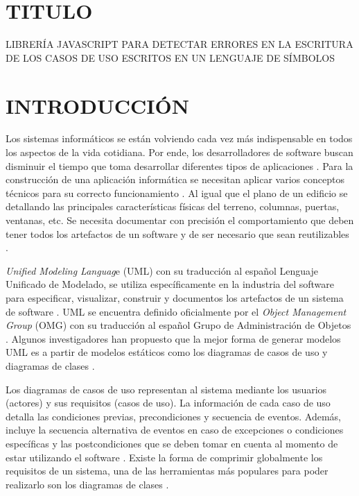 \documentclass[12pt,a4paper,final, xcolor=table, table]{article}
\begin{document}
	
	
	
	
	\section{TITULO}
	
	\par{LIBRERÍA JAVASCRIPT PARA DETECTAR ERRORES EN LA ESCRITURA DE LOS CASOS DE USO ESCRITOS EN UN LENGUAJE DE SÍMBOLOS}
	
	\section{INTRODUCCIÓN}
	
	Los sistemas informáticos se están volviendo cada vez más indispensable en todos los aspectos de la vida cotidiana. Por ende, los desarrolladores de software buscan disminuir el tiempo que toma desarrollar diferentes tipos de aplicaciones \parencite{Panthi2022}. Para la construcción de una aplicación informática se necesitan aplicar varios conceptos técnicos para su correcto funcionamiento \parencite{Chen2022}. Al igual que el plano de un edificio se detallando las principales características físicas del terreno, columnas, puertas, ventanas, etc. Se necesita documentar con precisión el comportamiento que deben tener todos los artefactos de un software y de ser necesario que sean reutilizables \parencite{Hamdi2022}.
	
	\textit{Unified Modeling Languag}e (UML) con su traducción al español Lenguaje Unificado de Modelado, se utiliza específicamente en la industria del software para especificar, visualizar, construir y documentos los artefactos de un sistema de software \parencite{Bergstrom2022}. UML se encuentra definido oficialmente por el \textit{Object Management Group} (OMG) con su traducción al español Grupo de Administración de Objetos \parencite{Omg2009}. Algunos investigadores han propuesto que la mejor forma de generar modelos UML es a partir de modelos estáticos como los diagramas de casos de uso y diagramas de clases \parencite{Jahan2021}.
	
	Los diagramas de casos de uso representan al sistema mediante los usuarios (actores) y sus requisitos (casos de uso). La información de cada caso de uso detalla las condiciones previas, precondiciones y secuencia de eventos. Además, incluye la secuencia alternativa de eventos en caso de excepciones o condiciones específicas y las postcondiciones que se deben tomar en cuenta al momento de estar utilizando el software \parencite{iqbal2020}. Existe la forma de comprimir globalmente los requisitos de un sistema, una de las herramientas más populares para poder realizarlo son los diagramas de clases \parencite{Abdelnabi2021}. 
	
\end{document}
